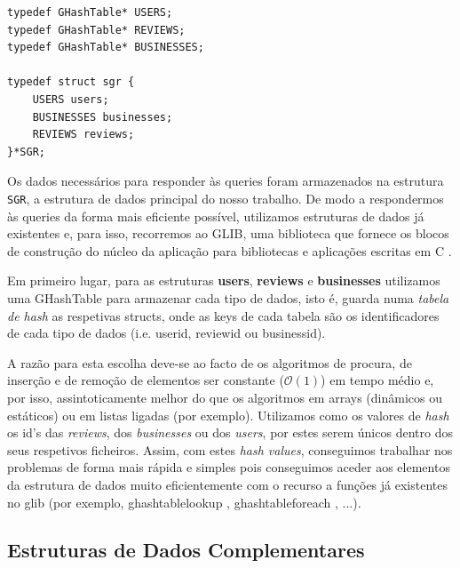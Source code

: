 \documentclass[a4paper]{article}
\begin{document}
\begin{verbatim}
typedef GHashTable* USERS;     
typedef GHashTable* REVIEWS;	
typedef GHashTable* BUSINESSES;

typedef struct sgr {
    USERS users; 
    BUSINESSES businesses;
    REVIEWS reviews; 
}*SGR;
\end{verbatim}

\vspace{0.2cm}

Os dados necessários para responder às queries foram armazenados
na estrutura \texttt{SGR}, a estrutura de dados principal do nosso trabalho.
De modo a respondermos às queries da forma mais eficiente possível, utilizamos estruturas de dados já existentes e, para isso, recorremos ao GLIB,
uma biblioteca que fornece os blocos de construção do núcleo da aplicação para bibliotecas 
e aplicações escritas em C \cite{glib}. \par

Em primeiro lugar, para as estruturas \textbf{users}, \textbf{reviews} e \textbf{businesses}
utilizamos uma GHashTable \cite{glibHTable} para armazenar cada tipo de dados, isto é, guarda numa \textit{tabela de hash} as respetivas structs, onde as keys de cada tabela são os identificadores de cada tipo de dados (i.e. user\textunderscore id, review\textunderscore id ou business\textunderscore id). \par

A razão para esta escolha deve-se ao facto de os algoritmos de procura, de inserção e de remoção de
elementos ser constante ($\mathcal{O}(1)$) em tempo médio e, por isso, assintoticamente melhor do que os
algoritmos em arrays (dinâmicos ou estáticos) ou em listas ligadas (por exemplo).
Utilizamos como os valores de \textit{hash} os id's das \textit{reviews}, dos \textit{businesses} ou dos
\textit{users}, por estes serem únicos dentro dos seus respetivos ficheiros.
Assim, com estes \textit{hash values}, conseguimos trabalhar nos problemas de forma mais rápida 
e simples pois conseguimos aceder aos elementos da estrutura de dados muito eficientemente com o
recurso a funções já existentes no glib (por exemplo, g\textunderscore hash\textunderscore table\textunderscore lookup \cite{ghtLookup}, 
g\textunderscore hash\textunderscore table\textunderscore foreach \cite{ghtForeach}, ...).\par


\subsection{Estruturas de Dados Complementares}
\label{sec:dados_complementares}
\end{document}
